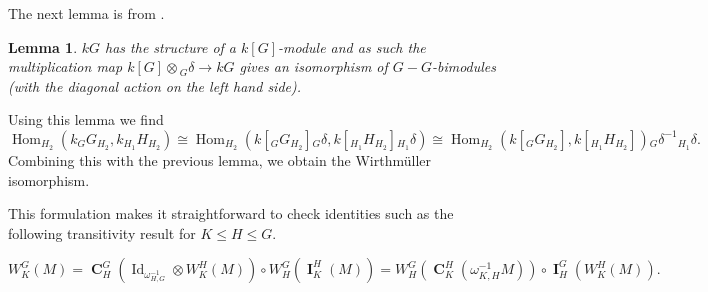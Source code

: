 \documentclass[12pt]{amsart}
\newtheorem{lemma}[theorem]{Lemma}
\theoremstyle{definition}
\DeclareMathOperator{\ind}{\mathbf{I}}
\DeclareMathOperator{\coind}{\mathbf{C}}
\DeclareMathOperator{\Hom}{Hom}
\DeclareMathOperator{\ide}{Id}
\begin{document}
The next lemma is from \cite[I 8.12 Remark 1]{MR2015057}.

\begin{lemma}
	$kG$ has the structure of a $k[G]$-module and as such  the multiplication map $k[G] \otimes {}_G \delta \rightarrow kG$ gives an isomorphism of $G{-}G$-bimodules (with the diagonal action on the left hand side).
\end{lemma}

Using this lemma we find
$$ \Hom _{H_2} (k {}_G G_{H_2}, k {}_{H_1}H_{H_2}) \cong \Hom _{H_2} (k [{}_G G_{H_2}] {}_G \delta , k [{}_{H_1}H_{H_2}] {}_{H_1} \delta ) \cong \Hom _{H_2} (k [{}_G G_{H_2}], k [{}_{H_1}H_{H_2}]) {}_G \delta^{-1} {}_{H_1} \delta .$$
Combining this with the previous lemma, we obtain the Wirthm\"uller isomorphism.


This formulation makes it straightforward to check identities such as the following transitivity result for $K \leq H \leq G$.

$$ W^G_K(M) = \coind ^G_H ( \ide_{\omega^{-1} _{H,G}} \otimes W^H_K(M)) \circ W^G_H( \ind ^H_K (M)) = W^G_H(\coind^H_K (\omega^{-1} _{K,H}M)) \circ \ind^G_H(W^H_K(M)).$$







\end{document}

